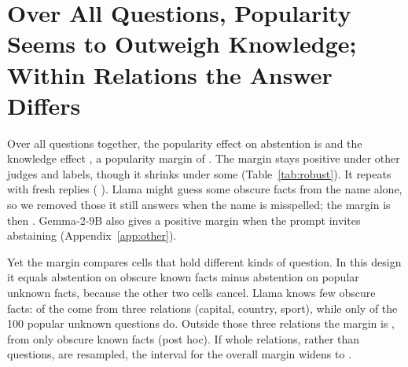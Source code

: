 \documentclass[11pt]{article}
\begin{document}
\section{Over All Questions, Popularity Seems to Outweigh Knowledge; Within Relations the Answer Differs}
\label{sec:relations}

Over all questions together, the popularity effect on abstention is \hmLlamaPopEff{} \hmLlamaPopEffCI{} and the knowledge effect \hmLlamaKnowEff{} \hmLlamaKnowEffCI, a popularity margin of \hmLlamaDiff{} \hmLlamaDiffCI. The margin stays positive under other judges and labels, though it shrinks under some (Table~\ref{tab:robust}). It repeats with fresh replies (\frDiff{} \frDiffCI). Llama might guess some obscure facts from the name alone, so we removed those it still answers when the name is misspelled; the margin is then \ncDiff{} \ncDiffCI. Gemma-2-9B also gives a positive margin when the prompt invites abstaining (Appendix~\ref{app:other}).

Yet the margin compares cells that hold different kinds of question. In this design it equals abstention on obscure known facts minus abstention on popular unknown facts, because the other two cells cancel. Llama knows few obscure facts: \rcTopThree{} of the \gsObsKnownTotal{} come from three relations (capital, country, sport), while only \msInUnkN{} of the 100 popular unknown questions do. Outside those three relations the margin is \msOutDiff{} \msOutDiffCI, from only \msOutKnownN{} obscure known facts (post hoc). If whole relations, rather than questions, are resampled, the interval for the overall margin widens to \rcClusCI.

\begin{table}[t]
\centering
\footnotesize\setlength{\tabcolsep}{3pt}
\caption{Holding the relation fixed, regex measure on all \faLlamaN{} labeled questions. All: every relation together. Within: mean over the three relations with at least 3 questions in every cell (country, composer, sport), resampling questions within relation and cell. Post hoc.}
\label{tab:within}
\end{table}
\end{document}
